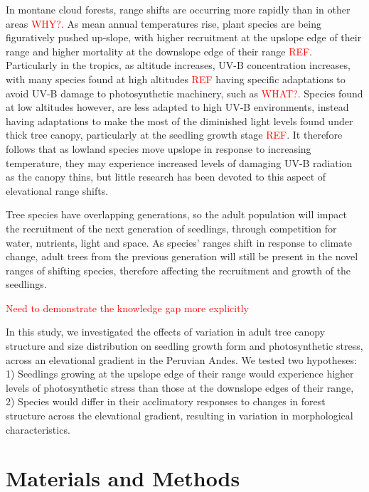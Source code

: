\documentclass[a4paper,11pt]{article}
\newcommand{\todo}[1]{\textcolor{red}{#1}}   %
\begin{document}
In montane cloud forests, range shifts are occurring more rapidly than in other areas \todo{WHY?}. As mean annual temperatures rise, plant species are being figuratively pushed up-slope, with higher recruitment at the upslope edge of their range and higher mortality at the downslope edge of their range \todo{REF}. Particularly in the tropics, as altitude increases, UV-B concentration increases, with many species found at high altitudes \todo{REF} having specific adaptations to avoid UV-B damage to photosynthetic machinery, such as \todo{WHAT?}. Species found at low altitudes however, are less adapted to high UV-B environments, instead having adaptations to make the most of the diminished light levels found under thick tree canopy, particularly at the seedling growth stage \todo{REF}. It therefore follows that as lowland species move upslope in response to increasing temperature, they may experience increased levels of damaging UV-B radiation as the canopy thins, but little research has been devoted to this aspect of elevational range shifts.  

Tree species have overlapping generations, so the adult population will impact the recruitment of the next generation of seedlings, through competition for water, nutrients, light and space. As species' ranges shift in response to climate change, adult trees from the previous generation will still be present in the novel ranges of shifting species, therefore affecting the recruitment and growth of the seedlings.

\todo{Need to demonstrate the knowledge gap more explicitly}

In this study, we investigated the effects of variation in adult tree canopy structure and size distribution on seedling growth form and photosynthetic stress, across an elevational gradient in the Peruvian Andes. We tested two hypotheses: 1) Seedlings growing at the upslope edge of their range would experience higher levels of photosynthetic stress than those at the downslope edges of their range, 2) Species would differ in their acclimatory responses to changes in forest structure across the elevational gradient, resulting in variation in morphological characteristics. 

\section*{Materials and Methods}
\end{document}
